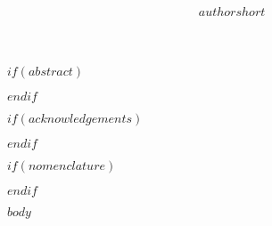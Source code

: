 \documentclass[
12pt,
oneside,
openany,
afrikaans,
UKenglish, %
$if(thesistype)$$thesistype$$endif$ %
]{stb-thesis}
\title{\bfseries\AorE{$titel$\\[1ex]\normalfont\small\itshape (``$title$'')}{$title$}}
\author{$authorshort$}{$author$}
\begin{document}
\frontmatter
\TitlePage

\DeclarationDate{\today}
\DeclarationPage

$if(abstract)$

$endif$

$if(acknowledgements)$

$endif$

\fancyhead{}
\fancyhead[L]{\footnotesize\nouppercase{\leftmark}}
\fancyhead[R]{\footnotesize\nouppercase{\rightmark}}

\tableofcontents
\listoffigures
\listoftables

$if(nomenclature)$

$endif$

\mainmatter
{}

$body$ %

\cleardoublepage
\backmatter
\fancyhead{}
\fancyhead[R]{\footnotesize\nouppercase{\rightmark}}

\end{document}
